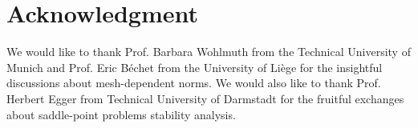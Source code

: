 \documentclass[journal]{IEEEtran}
\renewcommand{\vec}[1]{\boldsymbol{#1}} %
\renewcommand{\a}{\vec a}
\newcommand{\h}{\vec h}
\renewcommand{\O}{\Omega}
\newcommand{\Oa}{\Omega_a}
\newcommand{\Oh}{\Omega_h}
\newcommand{\Gm}{\Gamma_\text{m}}
\newcommand{\haf}{$h$-$a$-formulation\ }
\newcommand{\tafOnly}{$t$-$a$-formulation}
\newcommand{\hsp}{\mathcal{H}}
\newcommand{\asp}{\mathcal{A}}
\newcommand{\hspz}{\mathcal{H}_{0}}
\newcommand{\aspz}{\mathcal{A}_{0}}
\begin{document}







\section*{Acknowledgment}

We would like to thank Prof. Barbara Wohlmuth from the Technical University of Munich and Prof. Eric Béchet from the University of Liège for the insightful discussions about mesh-dependent norms. We would also like to thank Prof. Herbert Egger from Technical University of Darmstadt for the fruitful exchanges about saddle-point problems stability analysis.

\end{document}

